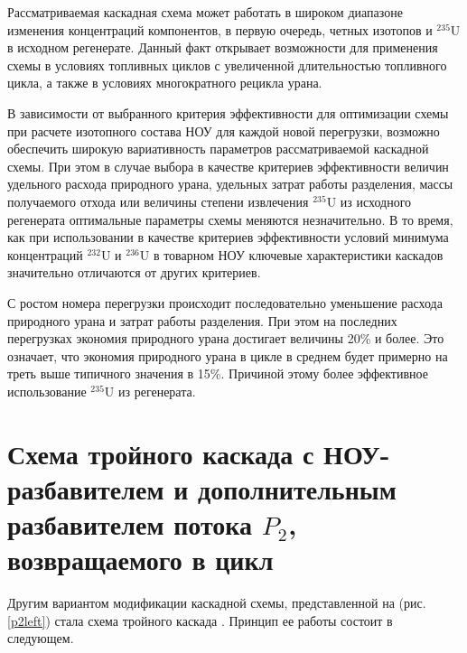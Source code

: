 Рассматриваемая каскадная схема может работать в широком диапазоне изменения концентраций компонентов, в первую очередь, четных изотопов и $^{235}$U в исходном регенерате. Данный факт открывает возможности для применения схемы в условиях топливных циклов с увеличенной длительностью топливного цикла, а также в условиях многократного рецикла урана.

В зависимости от выбранного критерия эффективности для оптимизации схемы при расчете изотопного состава НОУ для каждой новой перегрузки, возможно обеспечить широкую вариативность параметров рассматриваемой каскадной схемы. При этом в случае выбора в качестве критериев эффективности величин удельного расхода природного урана, удельных затрат работы разделения, массы получаемого отхода или величины степени извлечения $^{235}$U из исходного регенерата оптимальные параметры схемы меняются незначительно. В то время, как при использовании в качестве критериев эффективности условий минимума концентраций $^{232}$U и $^{236}$U в товарном НОУ ключевые характеристики каскадов значительно отличаются от других критериев.

С ростом номера перегрузки происходит последовательно уменьшение расхода природного урана и затрат работы разделения. При этом на последних перегрузках экономия природного урана достигает величины 20\% и более. Это означает, что экономия природного урана в цикле в среднем будет примерно на треть выше типичного значения в 15\%. Причиной этому более эффективное использование $^{235}$U из регенерата.







\section{Схема тройного каскада с НОУ-разбавителем и дополнительным разбавителем потока $P_2$, возвращаемого в цикл}

Другим вариантом модификации каскадной схемы, представленной на (рис. \ref{p2left}) стала схема тройного каскада \cite{smirnovApplyingEnrichmentCapacities2018}. Принцип ее работы состоит в следующем.

